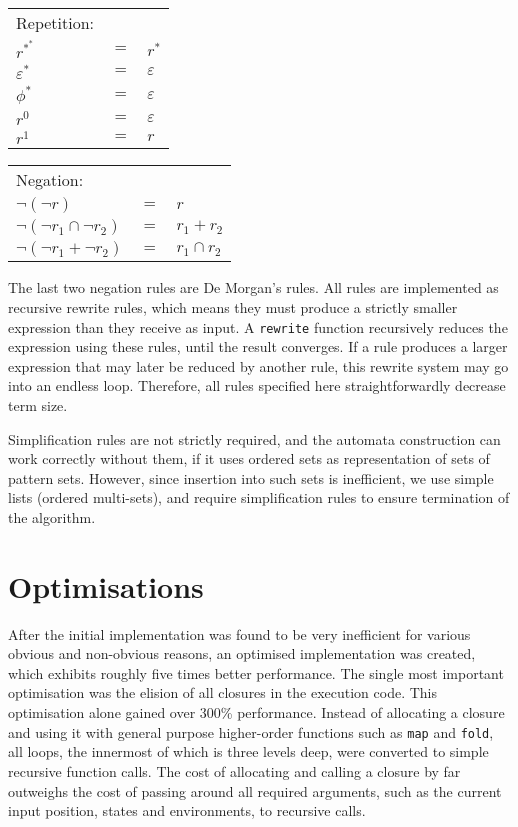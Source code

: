 \begin{defn}[Simplification]
   \begin{tabular}{lrl}
      Repetition:								\\
      $r^{*^*}$				& $=$	& $r^*$				\\
      $\varepsilon^*$			& $=$	& $\varepsilon$			\\
      $\phi^*$				& $=$	& $\varepsilon$			\\
      $r^0$				& $=$	& $\varepsilon$			\\
      $r^1$				& $=$	& $r$				\\
   \end{tabular}

   \needspace{2cm}
   \begin{tabular}{lrl}
      Negation:									\\
      $\neg(\neg r)$			& $=$	& $r$				\\
      $\neg(\neg r_1 \cap \neg r_2)$	& $=$	& $r_1 + r_2$			\\
      $\neg(\neg r_1 + \neg r_2)$	& $=$	& $r_1 \cap r_2$		\\
   \end{tabular}
\end{defn}

The last two negation rules are De Morgan's rules. All rules are implemented as
recursive rewrite rules, which means they must produce a strictly smaller
expression than they receive as input. A \texttt{rewrite} function recursively
reduces the expression using these rules, until the result converges. If a rule
produces a larger expression that may later be reduced by another rule, this
rewrite system may go into an endless loop. Therefore, all rules specified here
straightforwardly decrease term size.

\begin{rem}
   Simplification rules are not strictly required, and the automata construction
   can work correctly without them, if it uses ordered sets as representation of
   sets of pattern sets. However, since insertion into such sets is inefficient,
   we use simple lists (ordered multi-sets), and require simplification rules to
   ensure termination of the algorithm.
\end{rem}


\section{Optimisations}
\label{opts}

After the initial implementation was found to be very inefficient for various
obvious and non-obvious reasons, an optimised implementation was created, which
exhibits roughly five times better performance. The single most important
optimisation was the elision of all closures in the execution code. This
optimisation alone gained over 300\% performance. Instead of allocating a
closure and using it with general purpose higher-order functions such as
\texttt{map} and \texttt{fold}, all loops, the innermost of which is three
levels deep, were converted to simple recursive function calls. The cost of
allocating and calling a closure by far outweighs the cost of passing around all
required arguments, such as the current input position, states and
environments, to recursive calls.

